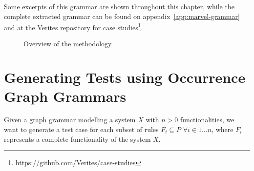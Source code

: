 Some excerpts of this grammar are shown throughout this chapter, while the complete extracted grammar can be found on appendix~\ref{app:marvel-grammar} and at the Verites repository for case studies\footnote{https://github.com/Verites/case-studies}.

\begin{figure}[!ht]
  \centering
  \caption{Overview of the methodology~\cite{Junior2015}.}\label{fig:tests:methodology}
\end{figure}

\section{Generating Tests using Occurrence Graph Grammars}

Given a graph grammar \graphGrammar{} modelling a system $X$ with $n > 0$ functionalities, we want to generate a test case for each subset of rules $F_i \subseteq P$ $\forall i \in 1\ldots n$, where $F_i$ represents a complete functionality  of the system $X$.

